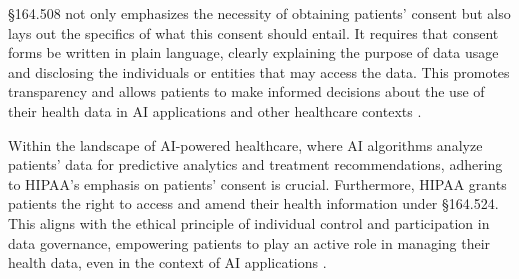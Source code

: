 \documentclass{article}
\begin{document}
§164.508 not only emphasizes the necessity of obtaining patients' consent but also lays out the specifics of what this consent should entail. It requires that consent forms be written in plain language, clearly explaining the purpose of data usage and disclosing the individuals or entities that may access the data. This promotes transparency and allows patients to make informed decisions about the use of their health data in AI applications and other healthcare contexts \cite{evans2023rules}.

Within the landscape of AI-powered healthcare, where AI algorithms analyze patients' data for predictive analytics and treatment recommendations, adhering to HIPAA's emphasis on patients' consent is crucial. Furthermore, HIPAA grants patients the right to access and amend their health information under §164.524. This aligns with the ethical principle of individual control and participation in data governance, empowering patients to play an active role in managing their health data, even in the context of AI applications \cite{deyoung2010experiences}.
\end{document}
